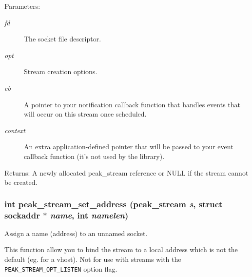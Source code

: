 \begin{Desc}
\item[Parameters:]
\begin{description}
\item[{\em fd}]The socket file descriptor. \item[{\em opt}]Stream creation options. \item[{\em cb}]A pointer to your notification callback function that handles events that will occur on this stream once scheduled. \item[{\em context}]An extra application-defined pointer that will be passed to your event callback function (it's not used by the library).\end{description}
\end{Desc}
\begin{Desc}
\item[Returns:]A newly allocated peak\_\-stream reference or NULL if the stream cannot be created. \end{Desc}
\hypertarget{group__stream__common_ga6}{
\subsubsection[peak\_\-stream\_\-set\_\-address]{\setlength{\rightskip}{0pt plus 5cm}int peak\_\-stream\_\-set\_\-address (\hyperlink{group__stream_ga0}{peak\_\-stream} {\em s}, struct sockaddr $\ast$ {\em name}, int {\em namelen})}}
\label{group__stream__common_ga6}


Assign a name (address) to an unnamed socket. 

This function allow you to bind the stream to a local address which is not the default (eg. for a vhost). Not for use with streams with the {\tt PEAK\_\-STREAM\_\-OPT\_\-LISTEN} option flag.


